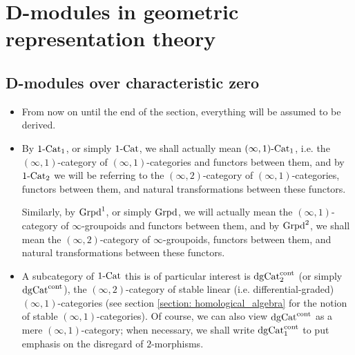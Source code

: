 \chapter{D-modules in geometric representation theory}
    \begin{abstract}
        
    \end{abstract}
    
    \minitoc
    
    \section{D-modules over characteristic zero} \label{section: D_modules_over_characteristic_0}
        \begin{convention} \label{conv: D_modules_everything_is_derived}
            \noindent
            \begin{itemize}
                \item From now on until the end of the section, everything will be assumed to be derived. 
                \item By $1\text{-}\mathrm{Cat}_1$, or simply $1\text{-}\mathrm{Cat}$, we shall actually mean $(\infty, 1)\text{-}\mathrm{Cat}_1$, i.e. the $(\infty, 1)$-category of $(\infty, 1)$-categories and functors between them, and by $1\text{-}\mathrm{Cat}_2$ we will be referring to the $(\infty, 2)$-category of $(\infty, 1)$-categories, functors between them, and natural transformations between these functors. 
                
                Similarly, by $\mathrm{Grpd}^1$, or simply $\mathrm{Grpd}$, we will actually mean the $(\infty, 1)$-category of $\infty$-groupoids and functors between them, and by $\mathrm{Grpd}^2$, we shall mean the $(\infty, 2)$-category of $\infty$-groupoids, functors between them, and natural transformations between these functors.
                \item A subcategory of $1\text{-}\mathrm{Cat}$ this is of particular interest is $\mathrm{dg}\mathrm{Cat}^{\mathrm{cont}}_2$ (or simply $\mathrm{dg}\mathrm{Cat}^{\mathrm{cont}}$), the $(\infty, 2)$-category of stable linear (i.e. differential-graded) $(\infty, 1)$-categories (see section \ref{section: homological_algebra} for the notion of stable $(\infty, 1)$-categories). Of course, we can also view $\mathrm{dg}\mathrm{Cat}^{\mathrm{cont}}$ as a mere $(\infty, 1)$-category; when necessary, we shall write $\mathrm{dg}\mathrm{Cat}^{\mathrm{cont}}_1$ to put emphasis on the disregard of $2$-morphisms.
            \end{itemize} 
        \end{convention}
    
